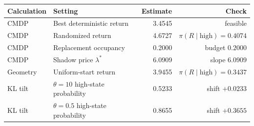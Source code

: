 \begin{tabular}{llrr}
\hline
Calculation & Setting & Estimate & Check \\
\hline
CMDP & Best deterministic return & 3.4545 & feasible \\
CMDP & Randomized return & 4.6727 & $\pi(R\mid\mathrm{high})=0.4074$ \\
CMDP & Replacement occupancy & 0.2000 & budget $0.2000$ \\
CMDP & Shadow price $\lambda^*$ & 6.0909 & slope $6.0909$ \\
Geometry & Uniform-start return & 3.9455 & $\pi(R\mid\mathrm{high})=0.3437$ \\
KL tilt & $\theta=10$ high-state probability & 0.5233 & shift $+0.0233$ \\
KL tilt & $\theta=0.5$ high-state probability & 0.8655 & shift $+0.3655$ \\
\hline
\end{tabular}

